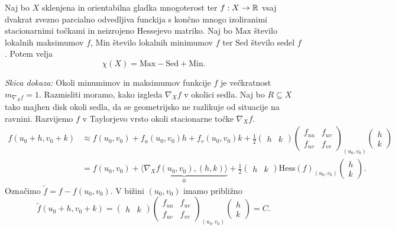 \begin{izrek}
\label{izr_formula_stacionarnih_tock}
Naj bo $X$ sklenjena in orientabilna gladka mnogoterost ter $f: X \to  \mathbb{R} $ vsaj dvakrat zvezno parcialno odvedljiva funckija s končno mnogo izoliranimi stacionarnimi točkami in neizrojeno Hessejevo matriko.
Naj bo $\text{Max}$ število lokalnih maksimumov $f$, $\text{Min}$ število lokalnih minimumov $f$ ter $\text{Sed}$ število sedel $f$. Potem velja \begin{equation*}
\chi(X) = \text{Max} - \text{Sed} + \text{Min}.
\end{equation*}  
\end{izrek}
\noindent
{\em Skica dokaza:\/}
Okoli minumimov in maksimumov funkcije $f$ je večkratnost $m_{\nabla_X f} = 1$. Razmisliti moramo, kako izgleda $\nabla_X f$ v okolici sedla.
Naj bo $R \subseteq X$ tako majhen disk okoli sedla, da se geometrijsko ne razlikuje od situacije na ravnini. Razvijemo $f$ v Taylorjevo vrsto okoli stacionarne točke $\nabla_X f$. \begin{align*}
f(u_0 + h, v_0 + k) &\approx f(u_0 ,v_0) + f_u(u_0, v_0)h + f_v(u_0, v_0)k + \frac{1}{2} \begin{pmatrix}
  h & k 
\end{pmatrix}
\begin{pmatrix}
  f_{uu} & f_{uv} \\
  f_{uv} & f_{vv}
\end{pmatrix}_{(u_0, v_0)}  
\begin{pmatrix}
  h \\
  k 
\end{pmatrix} \\
&= f(u_0, v_0) + \underbrace{\langle \nabla_X f (u_0, v_0), (h, k) \rangle}_0 +  \frac{1}{2} \begin{pmatrix}
    h & k 
  \end{pmatrix}
  \text{Hess}(f)_{(u_0, v_0)}  
  \begin{pmatrix}
    h \\
    k 
  \end{pmatrix}.\end{align*}  
Označimo $\tilde{f} = f - f(u_0, v_0).$ V bižini $(u_0, v_0)$ imamo približno \begin{equation*}
\tilde{f}(u_0 + h, v_0 + k) = \begin{pmatrix}
    h & k 
  \end{pmatrix}
  \begin{pmatrix}
    f_{uu} & f_{uv} \\
    f_{uv} & f_{vv}
  \end{pmatrix}_{(u_0, v_0)}  
  \begin{pmatrix}
    h \\
    k 
  \end{pmatrix} = C.
\end{equation*}  
